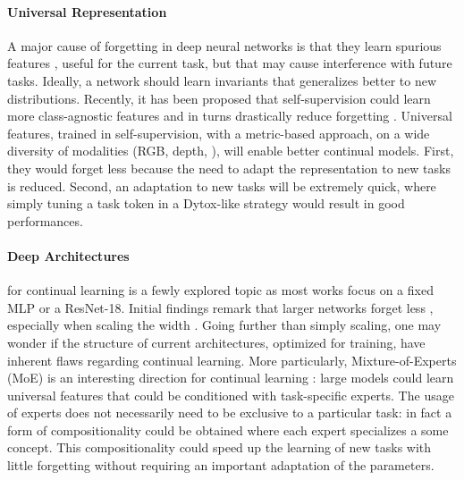\paragraph{Universal Representation} A major cause of forgetting in deep neural networks is that
they learn spurious features \citep{lesort2022spuriousfeatures}, useful for the current task, but
that may cause interference with future tasks. Ideally, a network should learn invariants
\citep{arjovsky2019irm,rame2021fishr} that generalizes better to new distributions. Recently, it has
been proposed that self-supervision could learn more class-agnostic features and in turns
drastically reduce forgetting \citep{gallardo2021selfsupcontinual}. Universal
features, trained in self-supervision, with a metric-based approach, on a wide diversity of
modalities (RGB, depth, \etc), will enable better continual models. First, they would forget less
because the need to adapt the representation to new tasks is reduced. Second, an adaptation to new
tasks will be extremely quick, where simply tuning a task token in a Dytox-like strategy would
result in good performances.

\vspace{2em}

\paragraph{Deep Architectures} for continual learning is a fewly explored topic as most works focus
on a fixed MLP or a ResNet-18. Initial findings remark that larger networks forget less
\citep{ramasesh2022scalecontinual}, especially when scaling the width
\citep{mirzadeh2022widecontinualnetworks}. Going further than simply scaling, one may wonder if the
structure of current architectures, optimized for \iid training, have inherent flaws regarding
continual learning. More particularly, Mixture-of-Experts (MoE) is an interesting direction for
continual learning \citep{caccia2022anytimelearning}: large models could learn universal features
that could be conditioned with task-specific experts. The usage of experts does not necessarily need
to be exclusive to a particular task: in fact a form of compositionality could be obtained where
each expert specializes a some concept. This compositionality could speed up the learning of new
tasks with little forgetting without requiring an important adaptation of the parameters.

